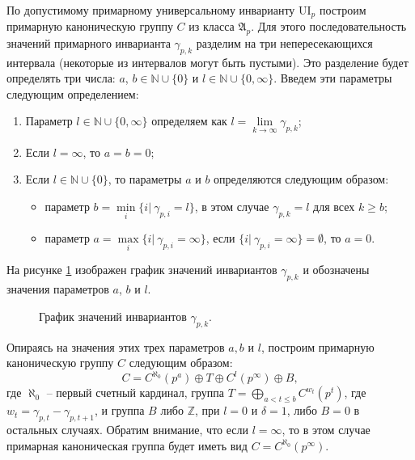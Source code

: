 \documentclass[a4paper,11pt,twoside]{article}
\def\A{{\mathfrak{A}}}
\def\Z{{\mathbb{Z}}}
\def\N{{\mathbb{N}}}
\def\ui{{\mathrm{UI}}}
\begin{document}
По допустимому примарному универсальному инварианту $\ui_p$ построим примарную каноническую группу $C$ из класса $\A_p$. Для этого последовательность значений примарного инварианта $\gamma_{p,k}$ разделим на три непересекающихся интервала (некоторые из интервалов могут быть пустыми). Это разделение будет определять три числа: $a$, $b \in \N \cup \{0\}$ и $l \in \N \cup \{0, \infty\}$. Введем эти параметры следующим определением:
\begin{enumerate}
\item Параметр $l \in \N \cup \{0, \infty\}$ определяем как $l = \lim\limits_{k \rightarrow \infty} \gamma_{p,k}$;
\item Если $l = \infty$, то $a = b = 0$;
\item Если $l \in \N \cup \{0\}$, то параметры $a$ и $b$ определяются следующим образом:
\begin{itemize}
\item параметр $b = \min\limits_{i} \{ i | \ \gamma_{p,i} = l\}$, в этом случае $\gamma_{p,k} = l$ для всех $k \geq b$;
\item параметр $a = \max\limits_{i} \{i | \ \gamma_{p,i} = \infty\}$, если $\{i | \ \gamma_{p,i} = \infty\} = \emptyset$, то $a = 0$.
\end{itemize}
\end{enumerate}

На рисунке \ref{pic:GammaPK} изображен график значений инвариантов $\gamma_{p,k}$ и обозначены значения параметров $a$, $b$ и $l$.

\begin{figure}[h!]
\centering
{}
\caption{График значений инвариантов $\gamma_{p,k}.$}\label{pic:GammaPK}
\end{figure}


Опираясь на значения этих трех параметров $a, b$ и $l$, построим примарную каноническую группу $C$ следующим образом:
$$C = C^{\aleph_0}(p^a) \oplus T \oplus C^l(p^\infty) \oplus B ,$$
где $\aleph_0$ -- первый счетный кардинал, группа $T = \bigoplus\limits_{ a < t \leq b} C^{w_t}(p^t)$, где $w_t = \gamma_{p,t} - \gamma_{p,t+1}$, и группа $B$ либо $\Z$, при $l = 0$ и $\delta = 1$, либо $B = 0$ в остальных случаях. Обратим внимание, что если $l = \infty$, то в этом случае примарная каноническая группа будет иметь вид $C = C^{\aleph_0}(p^\infty)$.
\end{document}
